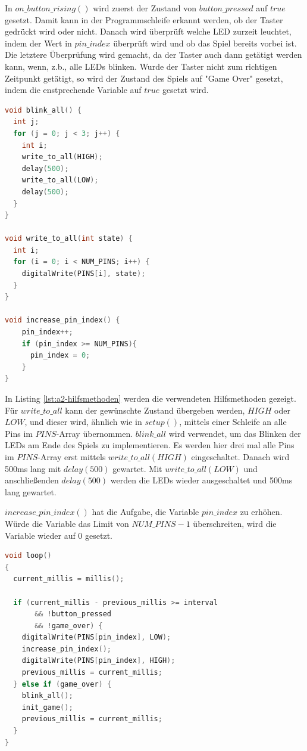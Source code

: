 In $on\_button\_rising()$ wird zuerst der Zustand von $button\_pressed$ auf $true$ gesetzt.
Damit kann in der Programmschleife erkannt werden, ob der Taster gedrückt wird oder nicht.
Danach wird überprüft welche LED zurzeit leuchtet, indem der Wert in $pin\_index$ überprüft wird und ob das Spiel bereits vorbei ist.
Die letztere Überprüfung wird gemacht, da der Taster auch dann getätigt werden kann, wenn, z.b., alle LEDs blinken.
Wurde der Taster nicht zum richtigen Zeitpunkt getätigt, so wird der Zustand des Spiels auf "Game Over" gesetzt, indem die enstprechende Variable auf $true$ gesetzt wird.

\begin{lstlisting}[language=C,label={lst:a2-hilfsmethoden}, caption={Hilfsmethoden}]
void blink_all() {
  int j;
  for (j = 0; j < 3; j++) {
    int i;
    write_to_all(HIGH);
    delay(500);
    write_to_all(LOW);
    delay(500);
  }
}

void write_to_all(int state) {
  int i;
  for (i = 0; i < NUM_PINS; i++) {
    digitalWrite(PINS[i], state);
  }
}

void increase_pin_index() {
    pin_index++;
    if (pin_index >= NUM_PINS){
      pin_index = 0;
    }
}
\end{lstlisting}

\newpage

In Listing \ref{lst:a2-hilfsmethoden} werden die verwendeten Hilfsmethoden gezeigt.
Für $write\_to\_all$ kann der gewünschte Zustand übergeben werden, $HIGH$ oder $LOW$, und dieser wird, ähnlich wie in $setup()$, mittels einer Schleife an alle Pins im $PINS$-Array übernommen.
$blink\_all$ wird verwendet, um das Blinken der LEDs am Ende des Spiels zu implementieren.
Es werden hier drei mal alle Pins im $PINS$-Array erst mittels $write\_to\_all(HIGH)$ eingeschaltet.
Danach wird 500ms lang mit $delay(500)$ gewartet.
Mit $write\_to\_all(LOW)$ und anschließenden $delay(500)$ werden die LEDs wieder ausgeschaltet und 500ms lang gewartet.

$increase\_pin\_index()$ hat die Aufgabe, die Variable $pin\_index$ zu erhöhen.
Würde die Variable das Limit von $NUM\_PINS-1$ überschreiten, wird die Variable wieder auf 0 gesetzt.

\begin{lstlisting}[language=C,label={lst:a2-loop}, caption={Programmschleife}]
void loop()
{
  current_millis = millis();

  if (current_millis - previous_millis >= interval
       && !button_pressed
       && !game_over) {
    digitalWrite(PINS[pin_index], LOW);
    increase_pin_index();
    digitalWrite(PINS[pin_index], HIGH);
	previous_millis = current_millis;
  } else if (game_over) {
    blink_all();
    init_game();
    previous_millis = current_millis;
  }
}
\end{lstlisting}


